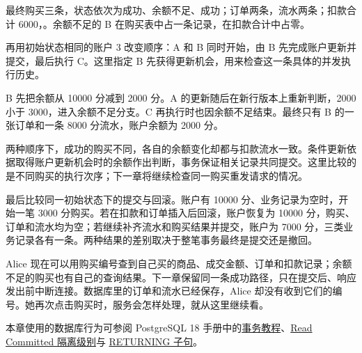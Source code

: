 最终购买三条，状态依次为成功、余额不足、成功；订单两条，流水两条；扣款合计 6000，。余额不足的 B 在购买表中占一条记录，在扣款合计中占零。

再用初始状态相同的账户 3 改变顺序：A 和 B 同时开始，由 B 先完成账户更新并提交，最后执行 C。这里指定 B 先获得更新机会，用来检查这一条具体的并发执行历史。

B 先把余额从 10000 分减到 2000 分。A 的更新随后在新行版本上重新判断，2000 小于 3000，进入余额不足分支。C 再执行时也因余额不足结束。最终只有 B 的一张订单和一条 8000 分流水，账户余额为 2000 分。

两种顺序下，成功的购买不同，各自的余额变化却都与扣款流水一致。条件更新依据取得账户更新机会时的余额作出判断，事务保证相关记录共同提交。这里比较的是不同购买的执行次序；下一章将继续检查同一购买重发请求的情况。

最后比较同一初始状态下的提交与回滚。账户有 10000 分、业务记录为空时，开始一笔 3000 分购买。若在扣款和订单插入后回滚，账户恢复为 10000 分，购买、订单和流水均为空；若继续补齐流水和购买结果并提交，账户为 7000 分，三类业务记录各有一条。两种结果的差别取决于整笔事务最终是提交还是撤回。

Alice 现在可以用购买编号查到自己买的商品、成交金额、订单和扣款记录；余额不足的购买也有自己的查询结果。下一章保留同一条成功路径，只在提交后、响应发出前中断连接。数据库里的订单和流水已经保存，Alice 却没有收到它们的编号。她再次点击购买时，服务会怎样处理，就从这里继续看。

本章使用的数据库行为可参阅 PostgreSQL 18 手册中的\href{https://www.postgresql.org/docs/18/tutorial-transactions.html}{事务教程}、\href{https://www.postgresql.org/docs/18/transaction-iso.html#XACT-READ-COMMITTED}{Read Committed 隔离级别}与 \href{https://www.postgresql.org/docs/18/dml-returning.html}{RETURNING 子句}。

